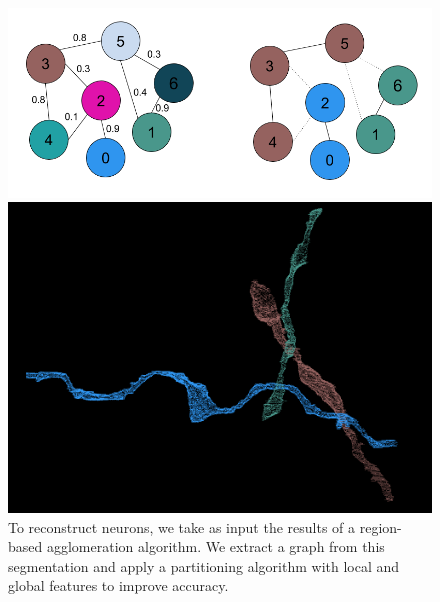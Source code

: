\documentclass[10pt,twocolumn,letterpaper]{article}
\begin{document}
\begin{figure}[t]
\begin{minipage}{\textwidth}
\begin{minipage}{0.24\textwidth}
		\end{minipage}
		\begin{minipage}{0.34\textwidth}
			\includegraphics[width=\linewidth]{figures/schema/multicut-graph.png}
		\end{minipage}
		\begin{minipage}{0.24\textwidth}
			\includegraphics[width=\linewidth]{figures/schema/post-multicut.png}
		\end{minipage}
		\caption{To reconstruct neurons, we take as input the results of a region-based agglomeration algorithm. We extract a graph from this segmentation and apply a partitioning algorithm with local and global features to improve accuracy.}
		\label{fig:teaser}
	\end{minipage}
\end{figure}
\end{document}
